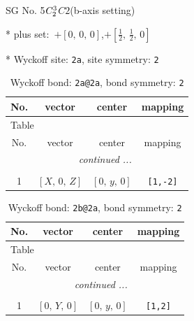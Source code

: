 \documentclass[fleqn,8pt]{jsarticle}
\begin{document}
\setcounter{MaxMatrixCols}{32}

\renewcommand{\tablename}{Table~}
\renewcommand{\figurename}{Figure~}
\begin{center}
\LARGE
SG No. 5\quad$C_{\rm 2}^{3}$\quad$C2$\quad(b-axis setting)\quad[ monoclinic ]
\end{center}

* plus set:\,\,\,$+\left[ 0,\, 0,\, 0 \right]$,\quad $+\left[ \frac{1}{2},\, \frac{1}{2},\, 0 \right]$


* Wyckoff site: {\tt 2a}, site symmetry: {\tt 2}
\renewcommand{\arraystretch}{1.2}
\begin{longtable}{cccc}
\caption{Wyckoff bond: {\tt 2a@2a}, bond symmetry: {\tt 2}}
 \\
 \hline \hline
No. & vector & center & mapping \\ \hline \endfirsthead

\multicolumn{3}{l}{\tablename\ \thetable{}} \\
 \hline \hline
No. & vector & center & mapping \\ \hline \endhead

 \hline \hline
\multicolumn{3}{r}{\footnotesize\it continued ...} \\ \endfoot

 \hline \hline
\multicolumn{3}{r}{} \\ \endlastfoot

1 & $\left[ X,\, 0,\, Z \right]$ & $\left[ 0,\, y,\, 0 \right]$ & {\tt [1,-2]} \\
\end{longtable}
\renewcommand{\arraystretch}{1.2}
\begin{longtable}{cccc}
\caption{Wyckoff bond: {\tt 2b@2a}, bond symmetry: {\tt 2}}
 \\
 \hline \hline
No. & vector & center & mapping \\ \hline \endfirsthead

\multicolumn{3}{l}{\tablename\ \thetable{}} \\
 \hline \hline
No. & vector & center & mapping \\ \hline \endhead

 \hline \hline
\multicolumn{3}{r}{\footnotesize\it continued ...} \\ \endfoot

 \hline \hline
\multicolumn{3}{r}{} \\ \endlastfoot

1 & $\left[ 0,\, Y,\, 0 \right]$ & $\left[ 0,\, y,\, 0 \right]$ & {\tt [1,2]} \\
\end{longtable}
\end{document}
